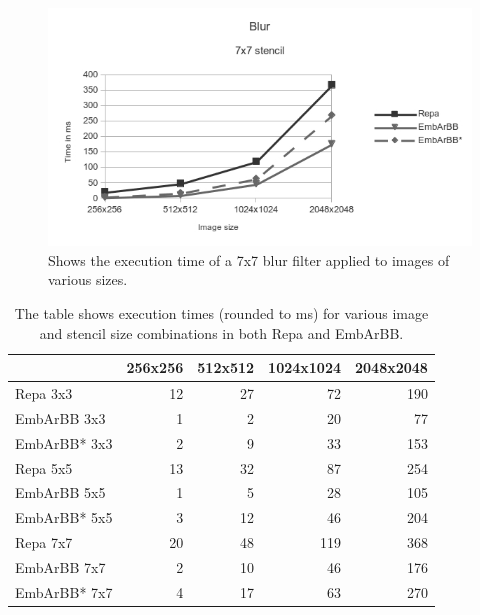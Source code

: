 \begin{figure}
\includegraphics[width=\linewidth]{./embarbb/img/blurchart}
\caption{Shows the execution time of a 7x7 blur filter applied to images 
         of various sizes.}
\label{fig:blurchart}
\end{figure}



\begin{table}
    \begin{small}
    \begin{tabular}{|l|r|r|r|r|}
        \hline
        ~             & 256x256 & 512x512 & 1024x1024 & 2048x2048 \\ \hline
        Repa 3x3      & 12 & 27 &  72 & 190 \\ 
        EmbArBB 3x3   &  1 &  2 &  20 &  77 \\
        EmbArBB* 3x3  &  2 &  9 &  33 & 153 \\  \hline 
        Repa 5x5      & 13 & 32 &  87 & 254 \\
        EmbArBB 5x5   &  1 &  5 &  28 & 105 \\ 
        EmbArBB* 5x5  &  3 & 12 &  46 & 204 \\  \hline 
        Repa 7x7      & 20 & 48 & 119 & 368 \\ 
        EmbArBB 7x7   &  2 & 10 &  46 & 176 \\ 
        EmbArBB* 7x7  &  4 & 17 &  63 & 270 \\
        \hline
    \end{tabular}
    \end{small}
\caption{The table shows execution times (rounded to ms) for various image and stencil size 
         combinations in both Repa and EmbArBB.}
\label{fig:blurtable}

\end{table}


